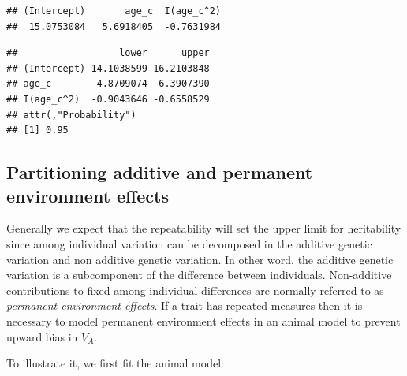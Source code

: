 \documentclass[
  12pt,
]{book}
\newenvironment{Shaded}{\begin{snugshade}}{\end{snugshade}}
\newcommand{\DataTypeTok}[1]{\textcolor[rgb]{0.13,0.29,0.53}{#1}}
\newcommand{\DecValTok}[1]{\textcolor[rgb]{0.00,0.00,0.81}{#1}}
\newcommand{\FloatTok}[1]{\textcolor[rgb]{0.00,0.00,0.81}{#1}}
\newcommand{\KeywordTok}[1]{\textcolor[rgb]{0.13,0.29,0.53}{\textbf{#1}}}
\newcommand{\NormalTok}[1]{#1}
\newcommand{\OperatorTok}[1]{\textcolor[rgb]{0.81,0.36,0.00}{\textbf{#1}}}
\newcommand{\OtherTok}[1]{\textcolor[rgb]{0.56,0.35,0.01}{#1}}
\newcommand{\StringTok}[1]{\textcolor[rgb]{0.31,0.60,0.02}{#1}}
\begin{document}
\begin{verbatim}
## (Intercept)       age_c  I(age_c^2) 
##  15.0753084   5.6918405  -0.7631984
\end{verbatim}

\begin{Shaded}
\end{Shaded}

\begin{verbatim}
##                  lower      upper
## (Intercept) 14.1038599 16.2103848
## age_c        4.8709074  6.3907390
## I(age_c^2)  -0.9043646 -0.6558529
## attr(,"Probability")
## [1] 0.95
\end{verbatim}

\hypertarget{partitioning-additive-and-permanent-environment-effects-1}{%
\subsection{Partitioning additive and permanent environment effects}\label{partitioning-additive-and-permanent-environment-effects-1}}

Generally we expect that the repeatability will set the upper limit for heritability since among individual variation can be decomposed in the additive genetic variation and non additive genetic variation. In other word, the additive genetic variation is a subcomponent of the difference between individuals.
Non-additive contributions to fixed among-individual differences are normally referred to as \emph{permanent environment effects}. If a trait has repeated measures then it is necessary to model permanent environment effects in an animal model to prevent upward bias in \(V_A\).

To illustrate it, we first fit the animal model:

\begin{Shaded}
\end{Shaded}
\end{document}
